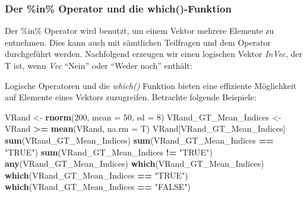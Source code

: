 \documentclass[]{article}
\newenvironment{Shaded}{\begin{snugshade}}{\end{snugshade}}
\newcommand{\KeywordTok}[1]{\textcolor[rgb]{0.13,0.29,0.53}{\textbf{#1}}}
\newcommand{\DataTypeTok}[1]{\textcolor[rgb]{0.13,0.29,0.53}{#1}}
\newcommand{\DecValTok}[1]{\textcolor[rgb]{0.00,0.00,0.81}{#1}}
\newcommand{\StringTok}[1]{\textcolor[rgb]{0.31,0.60,0.02}{#1}}
\newcommand{\OperatorTok}[1]{\textcolor[rgb]{0.81,0.36,0.00}{\textbf{#1}}}
\newcommand{\NormalTok}[1]{#1}
\begin{document}
\subsubsection*{Der \%in\% Operator und die
which()-Funktion}\label{der-in-operator-und-die-which-funktion}

Der \%in\% Operator wird benutzt, um einem Vektor mehrere Elemente zu
entnehmen. Dies kann auch mit sämtlichen Teilfragen und dem \textbar{}
Operator durchgeführt werden. Nachfolgend erzeugen wir einen logischen
Vektor \emph{InVec}, der T ist, wenn \emph{Vec} ``Nein'' oder ``Weder
noch'' enthält:

\begin{Shaded}
\end{Shaded}

Logische Operatoren und die \emph{which()} Funktion bieten eine
effiziente Möglichkeit auf Elemente eines Vektors zuzugreifen. Betrachte
folgende Beispiele:

\begin{Shaded}
\begin{Highlighting}[]
\NormalTok{    VRand <-}\StringTok{ }\KeywordTok{rnorm}\NormalTok{(}\DecValTok{200}\NormalTok{, }\DataTypeTok{mean =} \DecValTok{50}\NormalTok{, }\DataTypeTok{sd =} \DecValTok{8}\NormalTok{)}
\NormalTok{    VRand_GT_Mean_Indices <-}\StringTok{ }\NormalTok{VRand }\OperatorTok{>=}\StringTok{ }\KeywordTok{mean}\NormalTok{(VRand, }\DataTypeTok{na.rm =}\NormalTok{ T)}
\NormalTok{    VRand[VRand_GT_Mean_Indices]}
    \KeywordTok{sum}\NormalTok{(VRand_GT_Mean_Indices)}
    \KeywordTok{sum}\NormalTok{(VRand_GT_Mean_Indices }\OperatorTok{==}\StringTok{ "TRUE"}\NormalTok{)}
    \KeywordTok{sum}\NormalTok{(VRand_GT_Mean_Indices }\OperatorTok{!=}\StringTok{ "TRUE"}\NormalTok{)}
    \KeywordTok{any}\NormalTok{(VRand_GT_Mean_Indices)}
    \KeywordTok{which}\NormalTok{(VRand_GT_Mean_Indices)}
    \KeywordTok{which}\NormalTok{(VRand_GT_Mean_Indices }\OperatorTok{==}\StringTok{ "TRUE"}\NormalTok{)    }
    \KeywordTok{which}\NormalTok{(VRand_GT_Mean_Indices }\OperatorTok{==}\StringTok{ "FALSE"}\NormalTok{)    }
\end{Highlighting}
\end{Shaded}
\end{document}
